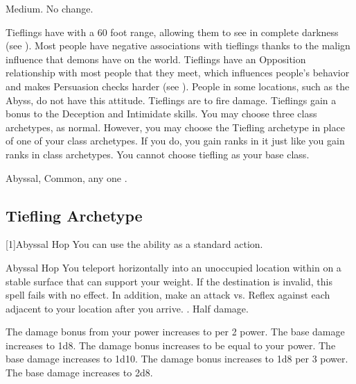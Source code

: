      Medium.
     No change.
    \begin{itemize}
         Tieflings have  with a 60 foot range, allowing them to see in complete darkness (see ).
         Most people have negative associations with tieflings thanks to the malign influence that demons have on the world.
            Tieflings have an Opposition relationship with most people that they meet, which influences people's behavior and makes Persuasion checks harder (see ).
            People in some locations, such as the Abyss, do not have this attitude.
         Tieflings are  to fire damage.
         Tieflings gain a  bonus to the Deception and Intimidate skills.
         You may choose three class archetypes, as normal.
            However, you may choose the Tiefling archetype in place of one of your class archetypes.
            If you do, you gain ranks in it just like you gain ranks in class archetypes.
            You cannot choose tiefling as your base class.
    \end{itemize}
     Abyssal, Common, any one .

    \subsection{Tiefling Archetype}
        [1]{Abyssal Hop} You can use the  ability as a standard action.
        \begin{magicalactiveability}{Abyssal Hop}
            \rankline
            You teleport horizontally into an unoccupied location within \shortrange on a stable surface that can support your weight.
            If the destination is invalid, this spell fails with no effect.
            In addition, make an attack vs. Reflex against each  adjacent to your location after you arrive.
            \hit {}.
            \miss Half damage.

            \rankline
             The damage bonus from your power increases to  per 2 power.
             The base damage increases to 1d8.
             The damage bonus increases to be equal to your power.
             The base damage increases to 1d10.
             The damage bonus increases to 1d8 per 3 power.
             The base damage increases to 2d8.
        \end{magicalactiveability}

